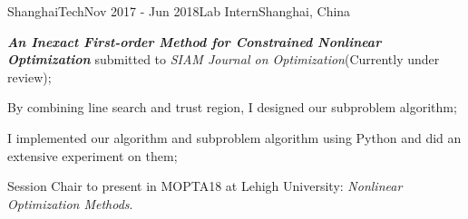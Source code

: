 \ifx\lang\eng
	\begin{rSubsection}{ShanghaiTech}{Nov 2017 - Jun 2018}{Lab Intern}{Shanghai, China}
		\item \textbf{\textit{An Inexact First-order Method for Constrained Nonlinear Optimization}} submitted to \textit{SIAM Journal on Optimization}(Currently under review);
		\item By combining line search and trust region, I designed our subproblem algorithm;
		\item I implemented our algorithm and subproblem algorithm using Python and did an extensive experiment on them;
		\item Session Chair to present in MOPTA18 at Lehigh University: \textit{Nonlinear Optimization Methods}.
	\end{rSubsection}
\fi
